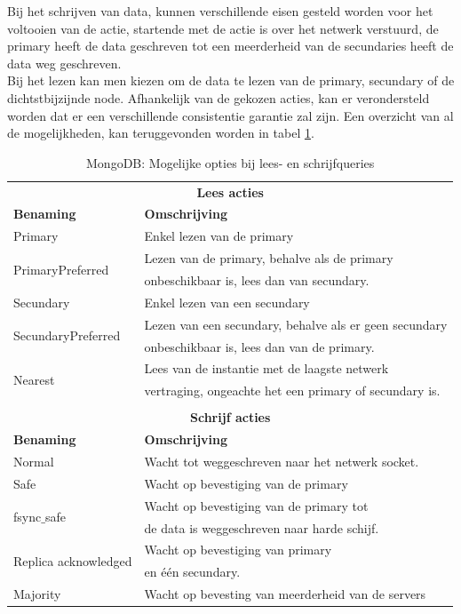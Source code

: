 Bij het schrijven van data, kunnen verschillende eisen gesteld worden voor het voltooien van de actie, startende met de actie is over het netwerk verstuurd, de primary heeft de data geschreven tot een meerderheid van de secundaries heeft de data weg geschreven. \\ Bij het lezen kan men kiezen om de data te lezen van de primary, secundary of de dichtstbijzijnde node. Afhankelijk van de gekozen acties, kan er verondersteld worden dat er een verschillende consistentie garantie zal zijn. Een overzicht van al de mogelijkheden, kan teruggevonden worden in tabel \ref{table:mongodb-query-opties}. 

\begin{table}[ht!]
	\centering
	\begin{tabular}{l|l}
		\multicolumn{2}{c}{\textbf{Lees acties}} \\ 
		\textbf{Benaming} & \textbf{Omschrijving} \\ \hline
		Primary & Enkel lezen van de primary \\
		\multirow{2}[1]{*}{PrimaryPreferred} & Lezen van de primary, behalve als de primary  \\
		& onbeschikbaar is, lees dan van secundary. \\
		Secundary & Enkel lezen van een secundary \\
		\multirow{2}[1]{*}{SecundaryPreferred} & Lezen van een secundary, behalve als er geen secundary  \\
				& onbeschikbaar is, lees dan van de primary. \\
		\multirow{2}[1]{*}{Nearest} & Lees van de instantie met de laagste netwerk \\
				& vertraging, ongeachte het een primary of secundary is. \\
		\multicolumn{2}{c}{\textbf{}} \\ 		
		
		\multicolumn{2}{c}{\textbf{Schrijf acties}} \\ 
		\textbf{Benaming} & \textbf{Omschrijving} \\ \hline
		Normal & Wacht tot weggeschreven naar het netwerk socket. \\
		\multirow{1}[1]{*}{Safe} & Wacht op bevestiging van de primary    \\
		
		\multirow{2}[1]{*}{fsync$\_$safe} & Wacht op bevestiging van de primary tot  \\
				& de data is weggeschreven naar harde schijf.  \\
		\multirow{2}[1]{*}{Replica acknowledged} & Wacht op bevestiging van primary  \\
				& en één secundary. \\
		\multirow{1}[1]{*}{Majority} & Wacht op bevesting van meerderheid van de servers  \\
	\end{tabular}
	\caption{MongoDB: Mogelijke opties bij lees- en schrijfqueries}
	\label{table:mongodb-query-opties}
\end{table}

